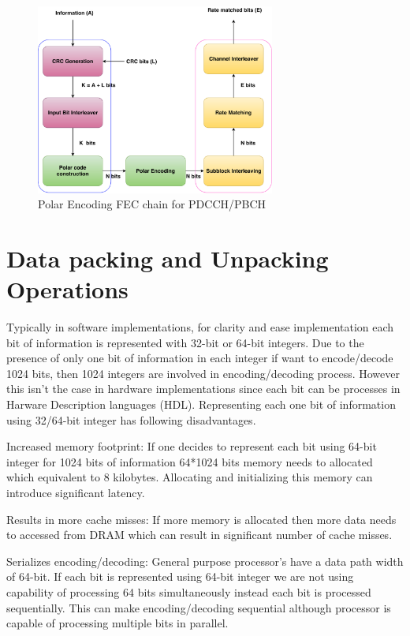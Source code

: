 \begin{figure}[h]
	\centering
	\includegraphics[width=0.7\textwidth]{./figures/5GFECChain.pdf}
	\caption{Polar Encoding FEC chain for PDCCH/PBCH}
	\label{fig:5g_fec_chain}
\end{figure}

\section{Data packing and Unpacking Operations} \label{dataPackUnpack}
Typically in software implementations, for clarity and ease implementation each bit of information is represented with 32-bit or 64-bit integers. Due to the presence of only one bit of information in each integer if want to encode/decode 1024 bits, then 1024 integers are involved in encoding/decoding process. However this isn't the case in hardware implementations since each bit can be processes in Harware Description languages (HDL). Representing each one bit of information using 32/64-bit integer has following disadvantages. 

\begin{description}[font=$\bullet$~\normalfont]
	\item Increased memory footprint: If one decides to represent each bit using 64-bit integer for 1024 bits of information 64*1024 bits memory needs to allocated which equivalent to 8 kilobytes. Allocating and initializing this memory can introduce significant latency.
	\item Results in more cache misses: If more memory is allocated then more data needs to accessed from DRAM which can result in significant number of cache misses.
	\item Serializes encoding/decoding: General purpose processor's have a data path width of 64-bit. If each bit is represented using 64-bit integer we are not using capability of processing 64 bits simultaneously instead each bit is processed sequentially. This can make encoding/decoding sequential although processor is capable of processing multiple bits in parallel.
\end{description}

